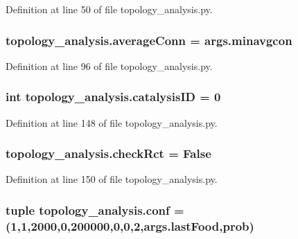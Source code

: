Definition at line 50 of file topology\+\_\+analysis.\+py.

\hypertarget{a00159_a0d59133b2bb42e7aa26a3dba3a2a9a70}{
\subsubsection[{average\+Conn}]{\setlength{\rightskip}{0pt plus 5cm}topology\+\_\+analysis.\+average\+Conn = args.\+minavgcon}}\label{a00159_a0d59133b2bb42e7aa26a3dba3a2a9a70}


Definition at line 96 of file topology\+\_\+analysis.\+py.

\hypertarget{a00159_a35953bf84aa0f7a2a3ffa3f68190c0fa}{
\subsubsection[{catalysis\+I\+D}]{\setlength{\rightskip}{0pt plus 5cm}int topology\+\_\+analysis.\+catalysis\+I\+D = 0}}\label{a00159_a35953bf84aa0f7a2a3ffa3f68190c0fa}


Definition at line 148 of file topology\+\_\+analysis.\+py.

\hypertarget{a00159_a6f49caf3b9250cab918ae8dc5aef9931}{
\subsubsection[{check\+Rct}]{\setlength{\rightskip}{0pt plus 5cm}topology\+\_\+analysis.\+check\+Rct = False}}\label{a00159_a6f49caf3b9250cab918ae8dc5aef9931}


Definition at line 150 of file topology\+\_\+analysis.\+py.

\hypertarget{a00159_aa468c4ff92202c7d89fb631e8cb54dc8}{
\subsubsection[{conf}]{\setlength{\rightskip}{0pt plus 5cm}tuple topology\+\_\+analysis.\+conf = (1,1,2000,0,200000,0,0,2,args.\+last\+Food,{\bf prob})}}\label{a00159_aa468c4ff92202c7d89fb631e8cb54dc8}


